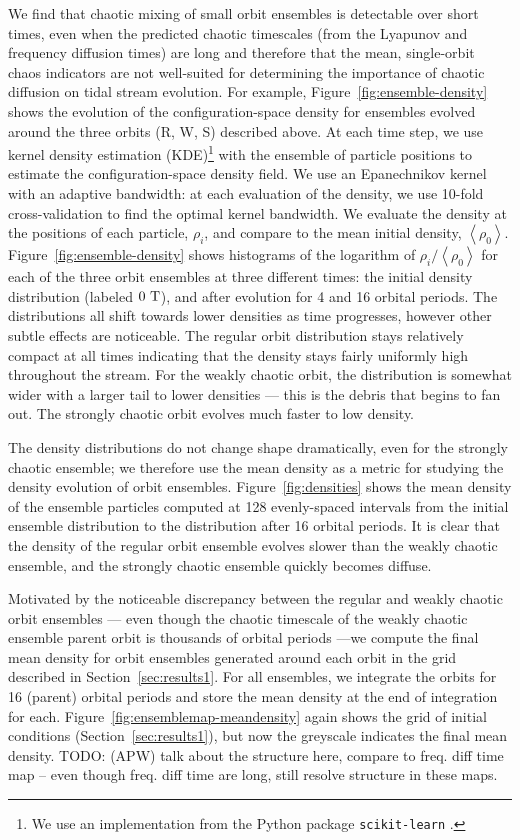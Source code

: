 \documentclass[letterpaper,12pt,preprint]{aastex}
\newcommand{\mean}[1]{\left< #1 \right>}
\newcommand{\periods}{\ensuremath{{\rm T}}}
\newcommand{\todo}[2]{{\color{red} TODO: (\MakeUppercase{#1}) #2}}
\begin{document}
We find that chaotic mixing of small orbit ensembles is detectable over short times, even when the predicted chaotic timescales (from the Lyapunov and frequency diffusion times) are long and therefore that the mean, single-orbit chaos indicators are not well-suited for determining the importance of chaotic diffusion on tidal stream evolution. For example, Figure~\ref{fig:ensemble-density} shows the evolution of the configuration-space density for ensembles evolved around the three orbits (R, W, S) described above. At each time step, we use kernel density estimation (KDE)\footnote{We use an implementation from the Python package \texttt{scikit-learn} \citep{scikitlearn}.} with the ensemble of particle positions to estimate the configuration-space density field. We use an Epanechnikov kernel with an adaptive bandwidth: at each evaluation of the density, we use 10-fold cross-validation to find the optimal kernel bandwidth. We evaluate the density at the positions of each particle, $\rho_i$, and compare to the mean initial density, $\mean{\rho_0}$. Figure~\ref{fig:ensemble-density} shows histograms of the logarithm of $\rho_i/\mean{\rho_0}$ for each of the three orbit ensembles at three different times: the initial density distribution (labeled $0~\periods$), and after evolution for 4 and 16 orbital periods. The distributions all shift towards lower densities as time progresses, however other subtle effects are noticeable. The regular orbit distribution stays relatively compact at all times indicating that the density stays fairly uniformly high throughout the stream. For the weakly chaotic orbit, the distribution is somewhat wider with a larger tail to lower densities --- this is the debris that begins to fan out. The strongly chaotic orbit evolves much faster to low density. 

The density distributions do not change shape dramatically, even for the strongly chaotic ensemble; we therefore use the mean density as a metric for studying the density evolution of orbit ensembles. Figure~\ref{fig:densities} shows the mean density of the ensemble particles computed at 128 evenly-spaced intervals from the initial ensemble distribution to the distribution after 16 orbital periods. It is clear that the density of the regular orbit ensemble evolves slower than the weakly chaotic ensemble, and the strongly chaotic ensemble quickly becomes diffuse.

Motivated by the noticeable discrepancy between the regular and weakly chaotic orbit ensembles --- even though the chaotic timescale of the weakly chaotic ensemble parent orbit is thousands of orbital periods ---we compute the final mean density for orbit ensembles generated around each orbit in the grid described in Section~\ref{sec:results1}. For all ensembles, we integrate the orbits for 16 (parent) orbital periods and store the mean density at the end of integration for each. Figure~\ref{fig:ensemblemap-meandensity} again shows the grid of initial conditions (Section~\ref{sec:results1}), but now the greyscale indicates the final mean density. \todo{apw}{talk about the structure here, compare to freq. diff time map -- even though freq. diff time are long, still resolve structure in these maps.}
\end{document}
